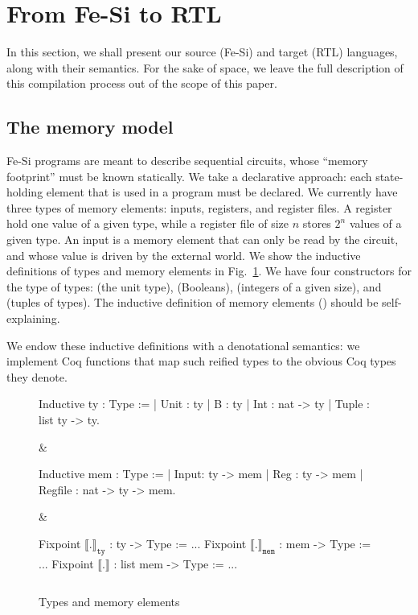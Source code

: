 \documentclass{llncs}
\newcommand{\denote}[1]{\llbracket #1 \rrbracket}
\newcommand{\denotety}[1]{\denote{\mathtt{#1}}_{\mathtt{ty}}}
\newcommand{\denotemem}[1]{\denote{\mathtt{#1}}_{\mathtt{mem}}}
\begin{document}
\section{From Fe-Si to RTL}

In this section, we shall present our source (Fe-Si) and target (RTL)
languages, along with their semantics. For the sake of space, we leave
the full description of this compilation process out of the scope of
this paper.

\subsection{The memory model}
Fe-Si programs are meant to describe sequential circuits, whose
``memory footprint'' must be known statically. We take a declarative
approach: each state-holding element that is used in a program must be
declared. 
%
We currently have three types of memory elements: inputs, registers,
and register files. A register hold one value of a given type, while a
register file of size $n$ stores $2^n$ values of a given type. 
%
An input is a memory element that can only be read by the circuit,
and whose value is driven by the external world.
%
We show the inductive definitions of types and memory elements in
Fig.~\ref{fig:type}. 
%
We have four constructors for the type  of types: 
(the unit type),  (Booleans),  (integers of a given
size), and  (tuples of types). The inductive definition of
memory elements () should be self-explaining. 

We endow these inductive definitions with a denotational semantics: we
implement Coq functions that map such reified types to the obvious Coq
types they denote.

\begin{figure}
  \centering
\begin{threelistings}
\begin{coq}
Inductive ty : Type :=
| Unit : ty 
| B : ty 
| Int : nat -> ty
| Tuple : list ty -> ty.     
\end{coq}&
\begin{coq}
Inductive mem : Type :=
| Input: ty ->  mem
| Reg : ty -> mem
| Regfile : nat -> ty -> mem. 
$ $
\end{coq}
&
\begin{coq}
Fixpoint $\denotety{.}$ : ty -> Type := ...
Fixpoint $\denotemem{.}$ : mem -> Type := ...
Fixpoint $\denote{.}$ : list mem -> Type := ...

$ $
\end{coq}
\end{threelistings}
\caption{Types and memory elements}
  \label{fig:type}
\end{figure}
\end{document}
